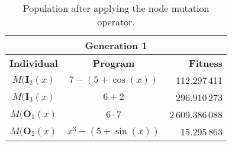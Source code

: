 \begin{table}[ht!]
  \centering
  \begin{tabular}{c|c|r}
    \multicolumn{3}{c}{\textbf{Generation 1}}	\\
    \hline
    \hline
    \textbf{Individual}	& \textbf{Program}	& \textbf{Fitness}	\\
    \hline
    \(M(\mathbf{I}_2(x)\)	& \(7 - (5 + \cos(x))\)	& 112.297\,411	\\
    \(M(\mathbf{I}_3(x)\)	& \(6 + 2\)	& 296.910\,273	\\
    \(M(\mathbf{O}_1(x)\)	& \(6 \cdot 7\)	& 2\,609.386\,088	\\
    \(M(\mathbf{O}_2(x)\)	& \(x^3 - (5 + \sin(x))\)	& 15.295\,863	\\
  \end{tabular}
  \caption{Population after applying the node mutation operator.}
  \label{tab:bg:gp:variation:mutation:node:fitness}
\end{table}